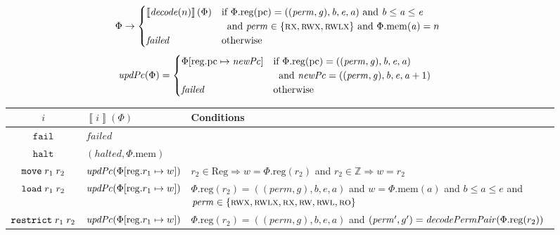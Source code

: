 \documentclass{llncs}
\newcommand{\update}[2]{[#1 \mapsto #2]}
\newcommand{\sem}[1]{\left\llbracket #1 \right\rrbracket}
\newcommand{\var}[1]{\mathit{#1}}
\newcommand{\gl}{\var{g}}
\newcommand{\pcreg}{\mathrm{pc}}
\newcommand{\addr}{\var{a}}
\newcommand{\start}{\var{b}}
\newcommand{\addrend}{\var{e}}
\newcommand{\perm}{\var{perm}}
\newcommand{\stdcap}[1][(\perm,\gl)]{\left(#1,\start,\addrend,\addr \right)}
\newcommand{\plainproj}[1]{\mathrm{#1}}
\newcommand{\memheap}[1][\Phi]{#1.\plainproj{mem}}
\newcommand{\memreg}[1][\Phi]{#1.\plainproj{reg}}
\newcommand{\updateReg}[3][\Phi]{#1\update{\plainproj{reg}.#2}{#3}}
\newcommand{\failed}{\mathit{failed}}
\newcommand{\halted}{\mathit{halted}}
\newcommand{\plainfun}[2]{
  \ifthenelse{\equal{#2}{}}
  {\mathit{#1}}
  {\mathit{#1}(#2)}
}
\newcommand{\decode}{\plainfun{decode}{}}
\newcommand{\decodePermPair}{\plainfun{decodePermPair}}
\newcommand{\stdUpdatePc}[1]{\plainfun{updPc}{#1}}
\newcommand{\plaindom}[1]{\mathrm{#1}}
\newcommand{\Regs}{\plaindom{Reg}}
\newcommand{\ints}{\mathbb{Z}}
\newcommand{\refreg}[1]{#1}
\newcommand{\refheap}[1]{#1}
\newcommand{\zinstr}[1]{\mathtt{#1}}
\newcommand{\fail}{\zinstr{fail}}
\newcommand{\halt}{\zinstr{halt}}
\newcommand{\twoinstr}[3]{
  \ifthenelse{\equal{#2#3}{}}
  {\zinstr{#1}}
  {\zinstr{#1} \; #2 \; #3}
}
\newcommand{\restricttwo}[2]{\twoinstr{restrict}{#1}{#2}}
\newcommand{\move}[2]{\twoinstr{move}{#1}{#2}}
\newcommand{\load}[2]{\twoinstr{load}{#1}{#2}}
\newcommand{\plainperm}[1]{\textsc{#1}}
\newcommand{\readonly}{\plainperm{ro}}
\newcommand{\readwrite}{\plainperm{rw}}
\newcommand{\exec}{\plainperm{rx}}
\newcommand{\rwx}{\plainperm{rwx}}
\newcommand{\readwritel}{\plainperm{rwl}}
\newcommand{\rwlx}{\plainperm{rwlx}}
\begin{document}
\begin{figure}
  \centering
  \begin{equation*}
    \Phi  \rightarrow
    \begin{cases}
      \sem{\decode(n)}(\Phi) & \arraycolsep=0pt
      \begin{array}[t]{l}
        \text{if $\memreg(\pcreg) = \stdcap$ and $\start \leq \addr \leq \addrend$}\\ 
        \text{\;\;and $\perm \in \{ \exec,\rwx, \rwlx \}$ and $\memheap(\addr) = n$ }
      \end{array}
\\
      \failed                                 & \text{otherwise}
    \end{cases}
  \end{equation*}
  \begin{align*}
    \stdUpdatePc{\Phi} &=
                         \begin{cases}
                           \updateReg{\pcreg}{\var{newPc}} & \arraycolsep=0pt
                           \begin{array}[t]{l}
                             \text{if $\memreg(\pcreg) = \stdcap$}\\
                             \text{\;\;and $\var{newPc} = ((\perm,\gl),\start,\addrend,\addr + 1)$}
                           \end{array}
\\
                             \failed & \text{otherwise}
                         \end{cases}
  \end{align*}
  \begin{tabular}{|c|p{3.4cm}|p{7.3cm}|}
    \hline
    $i$&$\sem{i}(\Phi)$&Conditions\\
    \hline 
    $\fail$&$\failed$&\\
    \hline
    $\halt$&$(\halted,\memheap)$&\\
    \hline
    $\move{\refreg{r_1}}{r_2}$& $\stdUpdatePc{}(\updateReg{r_1}{w})$&$r_2 \in \Regs \Rightarrow w = \memreg(r_2)$ and $r_2 \in \ints \Rightarrow w = r_2$\\
    \hline
    $\load{\refreg{r_1}}{\refheap{r_2}}$&$\stdUpdatePc{\updateReg{r_1}{w}}$&$\memreg(r_2) = \stdcap{}$ and  $w = \memheap(\addr)$ and $\start \leq \addr \leq \addrend$ and $\perm \in \{ \rwx, \rwlx, \exec, \readwrite, \readwritel, \readonly \}$ \\
    \hline
    $\restricttwo{\refreg{r_1}}{r_2}$&$\stdUpdatePc{}(\updateReg{r_1}{w})$  & $\memreg(r_2) = \stdcap$ and $(\perm',g') = \decodePermPair{\memreg(r_2)}$

\end{tabular}
\end{figure}
\end{document}
